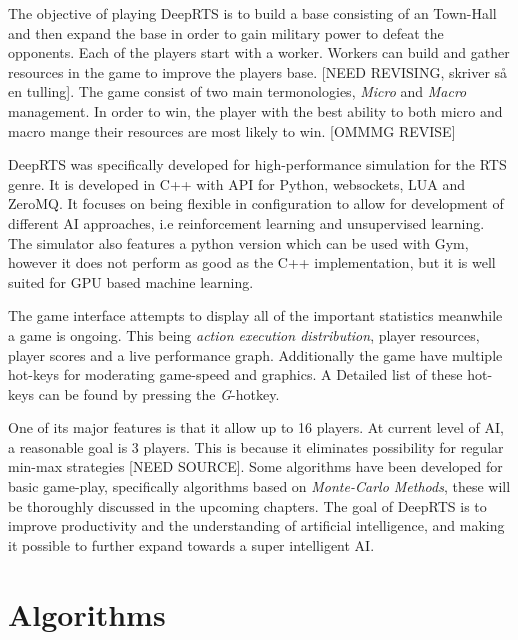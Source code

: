 \documentclass[fleqn,10pt]{article} %
\begin{document}
The objective of playing DeepRTS is to build a base consisting of an Town-Hall and then expand the base in order to gain military power to defeat the opponents. Each of the players start with a worker. Workers can build and gather resources in the game to improve the players base.   [NEED REVISING, skriver så en tulling]. The game consist of two main termonologies, \textit{Micro} and \textit{Macro} management. In order to win, the player with the best ability to both micro and macro mange their resources are most likely to win. [OMMMG REVISE]

DeepRTS was specifically developed for high-performance simulation for the RTS genre. It is developed in C++ with API for Python, websockets, LUA and ZeroMQ. It focuses on being flexible in configuration to allow for development of different AI approaches, i.e reinforcement learning and unsupervised learning. The simulator also features a python version which can be used with Gym, however it does not perform as good as the C++ implementation, but it is well suited for GPU based machine learning.

The game interface attempts to display all of the important statistics meanwhile a game is ongoing. This being \textit{action execution distribution}, player resources, player scores and a live performance graph.
Additionally the game have multiple hot-keys for moderating game-speed and graphics. A Detailed list of these hot-keys can be found by pressing the \textit{G}-hotkey. 

One of its major features is that it allow up to 16 players. At current level of AI, a reasonable goal is 3 players. This is because it eliminates possibility for regular min-max strategies [NEED SOURCE]. Some algorithms have been developed for basic game-play, specifically algorithms based on \textit{Monte-Carlo Methods}, these will be thoroughly discussed in the upcoming chapters.
The goal of DeepRTS is to improve productivity and the understanding of artificial intelligence, and making it possible to further expand towards a super intelligent AI.


\section{Algorithms}
\end{document}
